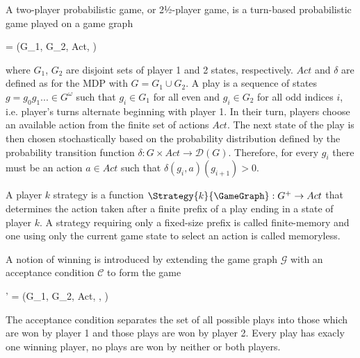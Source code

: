 \stopsubsection


\startsubsection[title={2-Player Probabilistic Games},reference=sec:theory-games-games]

    A two-player probabilistic game, or 2½-player game, is a turn-based probabilistic game played on a game graph

    \startformula
        \GameGraph = (G_1, G_2, Act, \Transition) \EndComma
    \stopformula

    where $G_1$, $G_2$ are disjoint sets of player 1 and 2 states, respectively.
    $Act$ and $\delta$ are defined as for the MDP with $G = G_1 \cup G_2$.
    A play is a sequence of states $g = g_0 g_1 ... \in G^\omega$ such that $g_i \in G_1$ for all even and $g_i \in G_2$ for all odd indices $i$, i.e. player's turns alternate beginning with player 1. %
    In their turn, players choose an available action from the finite set of actions $Act$.
    The next state of the play is then chosen stochastically based on the probability distribution defined by the probability transition function $\delta: G \times Act \rightarrow \mathcal{D}(G)$.
    Therefore, for every $g_i$ there must be an action $a \in Act$ such that $\delta(g_i, a)(g_{i+1}) \gt 0$.

    A player $k$ strategy is a function $\Strategy{k}{\GameGraph}: G^+ \rightarrow Act$ that determines the action taken after a finite prefix of a play ending in a state of player $k$.
    A strategy requiring only a fixed-size prefix is called finite-memory and one using only the current game state to select an action is called memoryless.

\stopsubsection


\startsubsection[title={Winning and Solving 2-Player Probabilistic Games}]

    A notion of winning is introduced by extending the game graph $\mathcal{G}$ with an acceptance condition $\mathcal{C}$ to form the game

    \startformula
        \GameGraph' = (G_1, G_2, Act, \Transition, \Condition) \EndPeriod
    \stopformula

    The acceptance condition separates the set of all possible plays into those which are won by player 1 and those plays are won by player 2.
    Every play has exacly one winning player, no plays are won by neither or both players.

